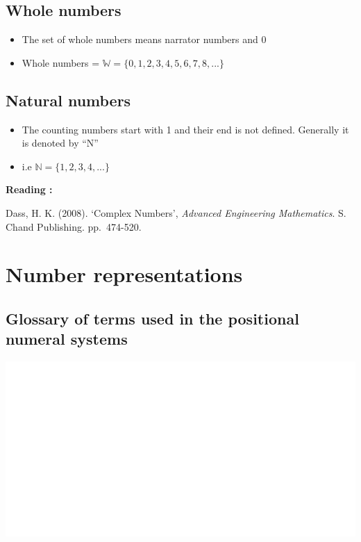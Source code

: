 \documentclass[]{book}
\providecommand{\tightlist}{%
  \setlength{\itemsep}{0pt}\setlength{\parskip}{0pt}}
\begin{document}
\hypertarget{whole-numbers}{%
\subsection{Whole numbers}\label{whole-numbers}}

\begin{itemize}
\tightlist
\item
  The set of whole numbers means narrator numbers and \(0\)
\item
  Whole numbers = \(\mathbb{W} = \{ 0,1,2,3,4,5,6,7,8,...\}\)
\end{itemize}

\hypertarget{natural-numbers}{%
\subsection{Natural numbers}\label{natural-numbers}}

\begin{itemize}
\tightlist
\item
  The counting numbers start with 1 and their end is not defined. Generally it is denoted by ``N''
\item
  i.e \(\mathbb{N} =\{1,2,3,4,...\}\)
\end{itemize}

\textbf{Reading :}

Dass, H. K. (2008). `Complex Numbers', \emph{Advanced Engineering Mathematics}. S. Chand Publishing. pp.~474-520.

\hypertarget{number-representations}{%
\section{Number representations}\label{number-representations}}

\hypertarget{glossary-of-terms-used-in-the-positional-numeral-systems}{%
\subsection{Glossary of terms used in the positional numeral systems}\label{glossary-of-terms-used-in-the-positional-numeral-systems}}

\begin{center}\includegraphics[width=1\linewidth]{figure/NSbox1-1} \end{center}
\end{document}
